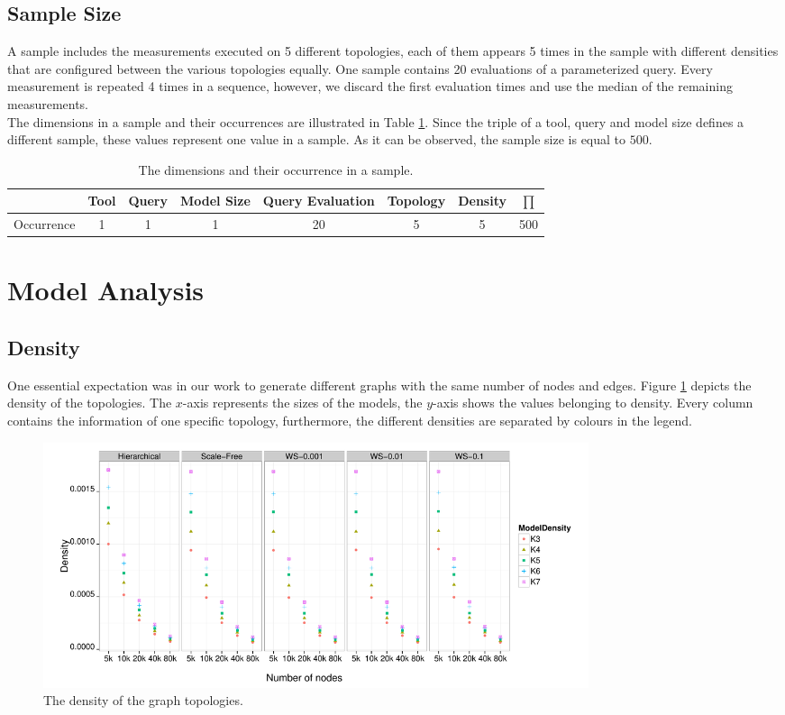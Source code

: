 \subsection{Sample Size}
A sample includes the measurements executed on 5 different topologies, each of them appears 5 times in the sample with different densities that are configured between the various topologies equally. One sample contains 20 evaluations of a parameterized query. Every measurement is repeated 4 times in a sequence, however, we discard the first evaluation times and use the median of the remaining measurements.\\
The dimensions in a sample and their occurrences are illustrated in Table \ref{tab:sample_size}. Since the triple of a tool, query and model size defines a different sample, these values represent one value in a sample. As it can be observed, the sample size is equal to $500$.

\begin{table}[ht]
	\footnotesize
	\centering
	
	\begin{tabular}{ l c c c c c c || c }
		\hline
		 & Tool & Query & Model Size & Query Evaluation & Topology  & Density & $\prod$\\ [5pt] \hline
		Occurrence & 1 & 1 & 1 & 20 & 5 & 5 & 500 \\ \hline
	\end{tabular}
	\caption{The dimensions and their occurrence in a sample.}
	\label{tab:sample_size}
\end{table}


\section{Model Analysis}

\subsection{Density}
One essential expectation was in our work to generate different graphs with the same number of nodes and edges. Figure \ref{fig:density} depicts the density of the topologies. The $x$-axis represents the sizes of the models, the $y$-axis shows the values belonging to density. Every column contains the information of one specific topology, furthermore, the different densities are separated by colours in the legend.
\begin{figure}[!ht]
	\centering
	\includegraphics[width=160mm, keepaspectratio]{figures/density.pdf}
	\caption{The density of the graph topologies.}
	\label{fig:density}
\end{figure}

